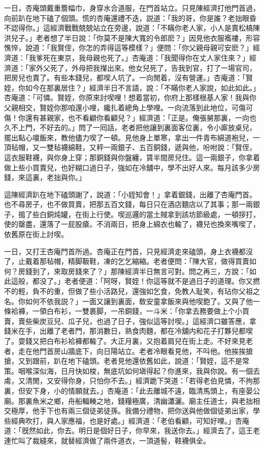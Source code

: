 一日，杏庵頭戴重簷幅巾，身穿水合道服，在門首站立。只見陳經濟打他門首過，向前趴在地下磕了個頭。慌的杏庵還禮不迭，説道：「我的哥，你是誰？老拙眼昏不認得你。」這經濟戰戰兢兢站立在旁邊，說道：「不瞞你老人家，小人是賣松槁陳洪兒子。」老者想了半日說：「你莫不是陳大寬的令郎麽？」因見他衣服襤褸，形容憔悴，說道：「我賢侄，你怎的弄得這等模樣？」便問：「你父親母親可安麽？」經濟道：「我爹死在東京，我母親也死了。」杏庵道：「我聞得你在丈人家住來？」經濟道：「家外父死了，外母把我攆出來。他女兒死了，告我到官，打了一場官司，把房兒也賣了。有些本錢兒，都喫人坑了。一向閒着，沒有營運。」杏庵道：「賢姪，你如今在那裏居住？」經濟半日不言語，說：「不瞞你老人家說，如此如此。」杏庵道：「可憐。賢姪，你原來討喫哩！想着當初，你府上那樣根基人家！我與你父親相交，賢姪你那咱還小哩，纔扎着總角上學哩。一向流落到此地位，可傷可傷！你還有甚親家，也不看顧你看顧兒？」經濟道：「正是。俺張舅那裏，一向也久不上門，不好去的。」問了一囘話，老者把他讓到裏面客位裏，令小廝放桌兒，擺出點心嗄飯來，教他儘力喫了一頓。見他身上單寒，拿出一件青布綿道袍兒，一頂毡帽，又一雙毡襪綿鞋，又秤一兩銀子、五百銅錢，遞與他，吩咐說：「賢侄，這衣服鞋襪，與你身上穿；那銅錢與你盤纏，賃半間房兒住。這一兩銀子，你拿着做上些小買賣兒，也好糊口過日子，強如在冷舖中，學不出好人來。每月該多少房錢，來這裏，老拙與你。」

這陳經濟趴在地下磕頭謝了，說道：「小姪知會！」拿着銀錢，出離了杏庵門首。也不尋房子，也不做買賣，把那五百文錢，每日只在酒店麵店以了其事；那一兩銀子，搗了些白銅炖罐，在街上行使。喫巡邏的當土賊拿到該坊節級處，一頓拶打，使的罄盡，還落了一屁股瘡。不消兩日，把身上綿衣也輸了，襪兒也換來嘴喫了，依舊原在街上討喫。

一日，又打王杏庵門首所過。杏庵正在門首，只見經濟走來磕頭，身上衣襪都沒了，止戴着那毡帽，精脚靸鞋，凍的乞乞縮縮。老者便問：「陳大官，做得買賣如何？房錢到了，來取房錢來了？」那陳經濟半日無言可對。問之再三，方說：「如此這般，都没了。」老者便道：「阿呀，賢姪！你這等就不是過日子的道理。你又撚不的輕，負不的重，但做了些小活路兒，還強如乞食，免教人耻笑，有玷你父祖之名。你如何不依我説？」一面又讓到裏面，敎安童拿飯來與他喫飽了。又與了他一條袷褲，一領白布衫，一雙裹脚，一吊銅錢，一斗米：「你拿去務要做上个小買賣，賣些柴炭豆兒、瓜子兒，也過了日子，強似這等討喫。」這經濟口雖答應，拿錢米在手，出離了老者門，那消數日，熟食肉麵，都在冷舖内和花子打夥兒都喫了。耍錢又把白布衫袷褲都輸了。大正月裏，又抱着肩兒在街上走。不好來見老者，走在他門首房山牆底下，向日陽站立。老者冷眼看見他，不呌他。他挨挨搶搶，又到跟前，趴在地下磕頭。老者見他還依舊如此，說道：「賢姪，這不是常策。咽喉深似海，日月快如梭，無底坑如何塡得起？你進來，我與你說。有一個去䖏，又清閒，又安得你身，只怕你不去。」經濟跪下哭道：「若得老伯見憐，不拘那裏，但安下身，小的情願就去。」杏庵道：「此去離城不遠，臨清馬頭上，有座晏公廟。那裏魚米之鄉，舟船輻輳之地，錢糧極廣，清幽瀟灑。廟主任道士，與老拙相交極厚，他手下也有兩三個徒弟徒孫。我備分禮物，把你送與他做個徒弟出家，學些經典吹打，與人家應福，也是好處。」經濟道：「老伯看顧，可知好哩。」杏庵道：「旣然如此，你去。明日是個好日子，你早來，我送你去。」經濟去了，這王老連忙叫了裁縫來，就替經濟做了兩件道衣，一頂道髻，鞋襪俱全。


